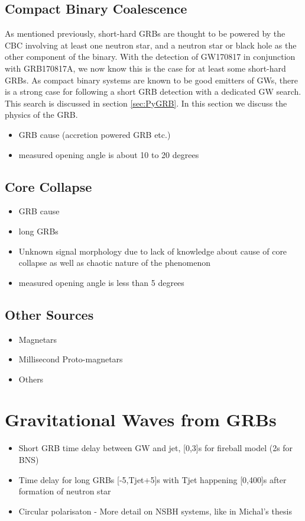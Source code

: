 \documentclass[11pt]{cuthesis}
\begin{document}
\subsection{Compact Binary Coalescence}
As mentioned previously, short-hard GRBs are thought to be powered by the CBC involving at least one neutron star, and a neutron star or black hole as the other component of the binary. With the detection of GW170817 in conjunction with GRB170817A, we now know this is the case for at least some short-hard GRBs. As compact binary systems are known to be good emitters of GWs, there is a strong case for following a short GRB detection with a dedicated GW search. This search is discussed in section \ref{sec:PyGRB}. In this section we discuss the physics of the GRB. 


\begin{itemize}
\item GRB cause (accretion powered GRB etc.)
\item measured opening angle is about 10 to 20 degrees
\end{itemize}

\subsection{Core Collapse}
\begin{itemize}
\item GRB cause
\item long GRBs
\item Unknown signal morphology due to lack of knowledge about cause of core collapse as well as chaotic nature of the phenomenon
\item measured opening angle is less than 5 degrees
\end{itemize}
\subsection{Other Sources}
\begin{itemize}
\item Magnetars
\item Millisecond Proto-magnetars
\item Others
\end{itemize}

\section{Gravitational Waves from GRBs}
\begin{itemize}
\item Short GRB time delay between GW and jet, [0,3]s for fireball model (2s for BNS)
\item Time delay for long GRBs [-5,Tjet+5]s with Tjet happening [0,400]s after formation of neutron star
\item Circular polarisaton - More detail on NSBH systems, like in Michal's thesis
\end{itemize}
\end{document}
